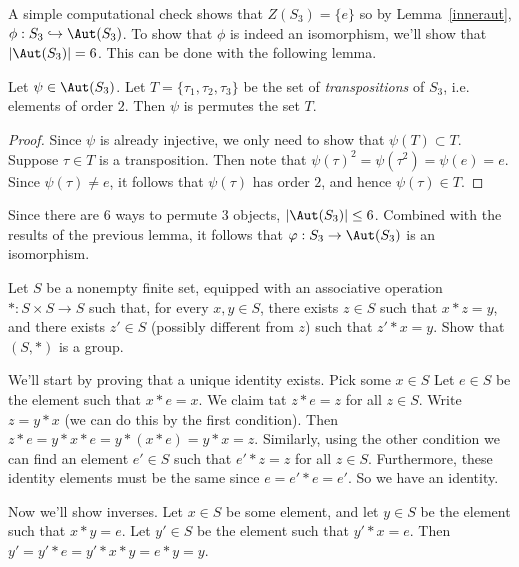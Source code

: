 \documentclass[11pt,letterpaper]{article}
\begin{document}
A simple computational check shows that $Z(S_3)=\{e\}$ so by Lemma~\ref{inneraut}, $\phi : S_3 \hookrightarrow \Aut(S_3)$. To show that $\phi$ is indeed an isomorphism, we'll show that $|\Aut(S_3)|=6$. This can be done with the following lemma.

\begin{lemma}
  Let $\psi\in \Aut(S_3)$. Let $T=\{\tau_1, \tau_2, \tau_3\}$ be the set of {\em{transpositions}} of $S_3$, i.e. elements of order $2$. Then $\psi$ is permutes the set $T$.
\end{lemma}
\begin{proof}
  Since $\psi$ is already injective, we only need to show that $\psi(T)\subset T$. Suppose $\tau\in T$ is a transposition. Then note that $\psi(\tau)^2=\psi(\tau^2)=\psi(e)=e$. Since $\psi(\tau)\neq e$, it follows that $\psi(\tau)$ has order $2$, and hence $\psi(\tau)\in T$.    
\end{proof}

Since there are $6$ ways to permute $3$ objects, $|\Aut(S_3)|\leq 6$. Combined with the results of the previous lemma, it follows that $\varphi : S_3 \to \Aut(S_3)$ is an isomorphism.  

\pagebreak
\begin{problem}
  Let $S$ be a nonempty finite set, equipped with an associative operation $*:S\times S\to S$ such that, for every $x,y\in S$, there exists $z\in S$ such that $x*z=y$, and there exists $z'\in S$ (possibly different from $z$) such that $z'*x=y$. Show that $(S,*)$ is a group.   
\end{problem}

We'll start by proving that a unique identity exists. Pick some $x\in S$ Let $e\in S$ be the element such that $x * e = x$. We claim tat $z * e = z$ for all $z\in S$. Write $z = y * x$ (we can do this by the first condition). Then $z * e = y * x * e = y * (x * e) = y * x = z$. Similarly, using the other condition we can find an element $e'\in S$ such that $e' * z = z$ for all $z\in S$. Furthermore, these identity elements must be the same since $e=e'*e=e'$. So we have an identity.

Now we'll show inverses. Let $x\in S$ be some element, and let $y\in S$ be the element such that $x * y = e$. Let $y'\in S$ be the element such that $y'*x=e$. Then $y'=y'*e=y'*x*y=e*y=y$.      
\end{document}
